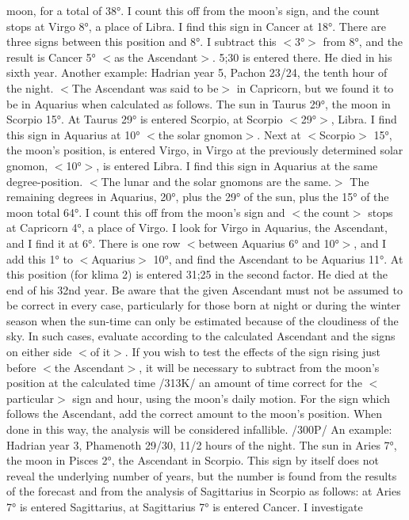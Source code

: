 moon, for a total of 38°. I count this off from the moon’s sign, and the count stops at Virgo 8°, a place of
Libra. I find this sign in Cancer at 18°. There are three signs between this position and 8°. I subtract this
$<$3°$>$ from 8°, and the result is Cancer 5° $<$as the Ascendant$>$. 5;30 is entered there. He died in his sixth
year.
Another example: Hadrian year 5, Pachon 23/24, the tenth hour of the night. $<$The Ascendant was
said to be$>$ in Capricorn, but we found it to be in Aquarius when calculated as follows. The sun in Taurus
29°, the moon in Scorpio 15°. At Taurus 29° is entered Scorpio, at Scorpio $<$29°$>$, Libra. I find this
sign in Aquarius at 10° $<$the solar gnomon$>$. Next at $<$Scorpio$>$ 15°, the moon’s position, is entered
Virgo, in Virgo at the previously determined solar gnomon, $<$10°$>$, is entered Libra. I find this sign in
Aquarius at the same degree-position. $<$The lunar and the solar gnomons are the same.$>$ The remaining
degrees in Aquarius, 20°, plus the 29° of the sun, plus the 15° of the moon total 64°. I count this off from
the moon’s sign and $<$the count$>$ stops at Capricorn 4°, a place of Virgo. I look for Virgo in Aquarius, the
Ascendant, and I find it at 6°. There is one row $<$between Aquarius 6° and 10°$>$, and I add this 1° to
$<$Aquarius$>$ 10°, and find the Ascendant to be Aquarius 11°. At this position (for klima 2) is entered
31;25 in the second factor. He died at the end of his 32nd year.
Be aware that the given Ascendant must not be assumed to be correct in every case, particularly for those born at night or during the winter season when the sun-time can only be estimated because of the
cloudiness of the sky. In such cases, evaluate according to the calculated Ascendant and the signs on either
side $<$of it$>$. If you wish to test the effects of the sign rising just before $<$the Ascendant$>$, it will be
necessary to subtract from the moon’s position at the calculated time /313K/ an amount of time correct for
the $<$particular$>$ sign and hour, using the moon’s daily motion. For the sign which follows the
Ascendant, add the correct amount to the moon’s position. When done in this way, the analysis will be
considered infallible.
/300P/ An example: Hadrian year 3, Phamenoth 29/30, 11/2 hours of the night. The sun in Aries 7°,
the moon in Pisces 2°, the Ascendant in Scorpio. This sign by itself does not reveal the underlying
number of years, but the number is found from the results of the forecast and from the analysis of Sagittarius
in Scorpio as follows: at Aries 7° is entered Sagittarius, at Sagittarius 7° is entered Cancer. I investigate
